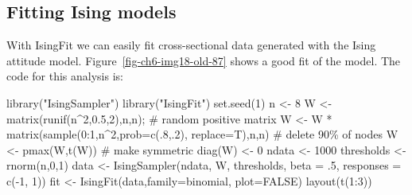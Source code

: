\documentclass[
  a4paper,
  DIV=11,
  numbers=noendperiod,
  oneside]{scrreprt}
\newenvironment{Shaded}{}{}
\newcommand{\AttributeTok}[1]{\textcolor[rgb]{0.84,0.23,0.29}{#1}}
\newcommand{\CommentTok}[1]{\textcolor[rgb]{0.42,0.45,0.49}{#1}}
\newcommand{\ConstantTok}[1]{\textcolor[rgb]{0.00,0.36,0.77}{#1}}
\newcommand{\DecValTok}[1]{\textcolor[rgb]{0.00,0.36,0.77}{#1}}
\newcommand{\FloatTok}[1]{\textcolor[rgb]{0.00,0.36,0.77}{#1}}
\newcommand{\FunctionTok}[1]{\textcolor[rgb]{0.44,0.26,0.76}{#1}}
\newcommand{\NormalTok}[1]{\textcolor[rgb]{0.14,0.16,0.18}{#1}}
\newcommand{\OtherTok}[1]{\textcolor[rgb]{0.44,0.26,0.76}{#1}}
\newcommand{\SpecialCharTok}[1]{\textcolor[rgb]{0.00,0.36,0.77}{#1}}
\newcommand{\StringTok}[1]{\textcolor[rgb]{0.01,0.18,0.38}{#1}}
\begin{document}
\subsection{Fitting Ising models}\label{sec-Fitting-Ising-models}

With IsingFit we can easily fit cross-sectional data generated with the
Ising attitude model. Figure~\ref{fig-ch6-img18-old-87} shows a good fit
of the model. The code for this analysis is:

\begin{Shaded}
\begin{Highlighting}[]
\FunctionTok{library}\NormalTok{(}\StringTok{"IsingSampler"}\NormalTok{)}
\FunctionTok{library}\NormalTok{(}\StringTok{"IsingFit"}\NormalTok{)}
\FunctionTok{set.seed}\NormalTok{(}\DecValTok{1}\NormalTok{)}
\NormalTok{n }\OtherTok{\textless{}{-}} \DecValTok{8}
\NormalTok{W }\OtherTok{\textless{}{-}} \FunctionTok{matrix}\NormalTok{(}\FunctionTok{runif}\NormalTok{(n}\SpecialCharTok{\^{}}\DecValTok{2}\NormalTok{,}\FloatTok{0.5}\NormalTok{,}\DecValTok{2}\NormalTok{),n,n); }\CommentTok{\# random positive matrix}
\NormalTok{W }\OtherTok{\textless{}{-}}\NormalTok{ W }\SpecialCharTok{*} \FunctionTok{matrix}\NormalTok{(}\FunctionTok{sample}\NormalTok{(}\DecValTok{0}\SpecialCharTok{:}\DecValTok{1}\NormalTok{,n}\SpecialCharTok{\^{}}\DecValTok{2}\NormalTok{,}\AttributeTok{prob=}\FunctionTok{c}\NormalTok{(.}\DecValTok{8}\NormalTok{,.}\DecValTok{2}\NormalTok{),}
        \AttributeTok{replace=}\NormalTok{T),n,n) }\CommentTok{\# delete 90\% of nodes}
\NormalTok{W }\OtherTok{\textless{}{-}} \FunctionTok{pmax}\NormalTok{(W,}\FunctionTok{t}\NormalTok{(W)) }\CommentTok{\# make symmetric }
\FunctionTok{diag}\NormalTok{(W) }\OtherTok{\textless{}{-}} \DecValTok{0}
\NormalTok{ndata }\OtherTok{\textless{}{-}} \DecValTok{1000}
\NormalTok{thresholds }\OtherTok{\textless{}{-}} \FunctionTok{rnorm}\NormalTok{(n,}\DecValTok{0}\NormalTok{,}\DecValTok{1}\NormalTok{) }
\NormalTok{data }\OtherTok{\textless{}{-}} \FunctionTok{IsingSampler}\NormalTok{(ndata, W, thresholds,}
        \AttributeTok{beta =}\NormalTok{ .}\DecValTok{5}\NormalTok{, }\AttributeTok{responses =} \FunctionTok{c}\NormalTok{(}\SpecialCharTok{{-}}\DecValTok{1}\NormalTok{, }\DecValTok{1}\NormalTok{))}
\NormalTok{fit }\OtherTok{\textless{}{-}} \FunctionTok{IsingFit}\NormalTok{(data,}\AttributeTok{family=}\StringTok{\textquotesingle{}binomial\textquotesingle{}}\NormalTok{, }\AttributeTok{plot=}\ConstantTok{FALSE}\NormalTok{)}
\FunctionTok{layout}\NormalTok{(}\FunctionTok{t}\NormalTok{(}\DecValTok{1}\SpecialCharTok{:}\DecValTok{3}\NormalTok{))}

\end{Highlighting}
\end{Shaded}
\end{document}
